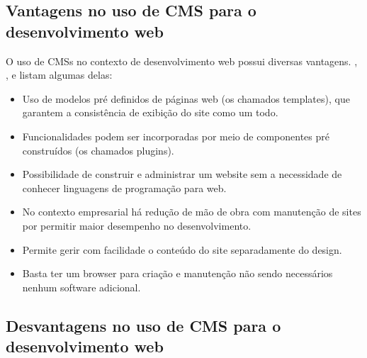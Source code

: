 \subsection{Vantagens no uso de CMS para o desenvolvimento web}

O uso de CMSs no contexto de desenvolvimento web possui diversas vantagens. , ,  e  listam algumas delas:
\begin{itemize}
\item Uso de modelos pré definidos de páginas web (os chamados templates), que garantem a consistência de exibição do site como um todo.
\item Funcionalidades podem ser incorporadas por meio de componentes pré construídos (os chamados plugins).
\item Possibilidade de construir e administrar um website sem a necessidade de conhecer linguagens de programação para web.
\item No contexto empresarial há redução de mão de obra com manutenção de sites por permitir maior desempenho no desenvolvimento.
\item Permite gerir com facilidade o conteúdo do site separadamente do design. 
\item Basta ter um browser para criação e manutenção não sendo necessários nenhum software adicional.
\end{itemize}

\subsection{Desvantagens no uso de CMS para o desenvolvimento web}

